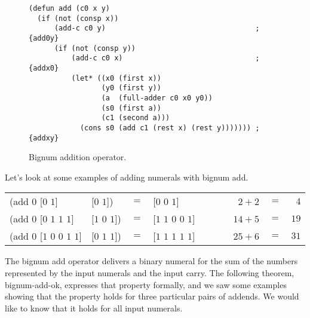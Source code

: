 \begin{figure}
\begin{code}
\begin{verbatim}
(defun add (c0 x y)
  (if (not (consp x))
      (add-c c0 y)                                   ; {add0y}
      (if (not (consp y))
          (add-c c0 x)                               ; {addx0}
          (let* ((x0 (first x))
                 (y0 (first y))
                 (a  (full-adder c0 x0 y0))
                 (s0 (first a))
                 (c1 (second a)))
            (cons s0 (add c1 (rest x) (rest y))))))) ; {addxy}
\end{verbatim}
\end{code}
\caption{Bignum addition operator.}%
\label{fig:bignum-add-defun}
\end{figure}

Let's look at some examples of adding numerals with bignum \textsf{add}.
\begin{center}
\addtolength{\tabcolsep}{-4pt}
\begin{tabular}{llclr|l|rcr}
\textsf{(add $0$ [$0$ $1$]}             &\textsf{[$0$ $1$])}     & $=$ &\textsf{[$0$ $0$ $1$]}         &&& ~~$2 + 2$  &$=$& $4$  \\
\textsf{(add $0$ [$0$ $1$ $1$ $1$]}     &\textsf{[$1$ $0$ $1$])} & $=$ &\textsf{[$1$ $1$ $0$ $0$ $1$]} &&& ~~$14 + 5$ &$=$& $19$ \\
\textsf{(add $0$ [$1$ $0$ $0$ $1$ $1$]} &\textsf{[$0$ $1$ $1$])} & $=$ &\textsf{[$1$ $1$ $1$ $1$ $1$]} &&& ~~$25 + 6$ &$=$& $31$ \\
\end{tabular}
\addtolength{\tabcolsep}{4pt}
\end{center}

The bignum \textsf{add} operator
delivers a binary numeral for the sum of
the numbers represented by the input numerals and the input carry.
The following theorem, \textsf{bignum-add-ok},
expresses that property formally,
and we saw some examples showing
that the property holds for three
particular pairs of addends.
We would like to know that it
holds for all input numerals.

